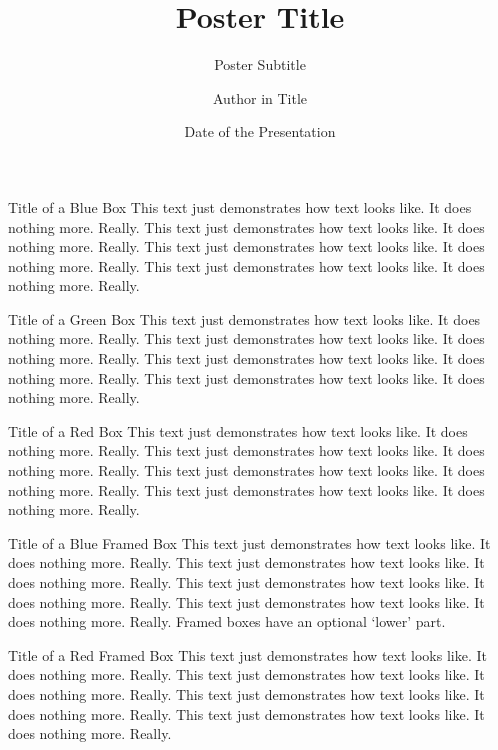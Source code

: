 \documentclass[cd=english,english,portrait]{univie-ling-poster}
\author[Author in Footline]{Author in Title}
\title{Poster Title}
\subtitle{Poster Subtitle}
\date{Date of the Presentation}
\begin{document}
\begin{frame}

\begin{bluebox}{Title of a Blue Box}
	This text just demonstrates how text looks like. It does nothing more. Really.
	This text just demonstrates how text looks like. It does nothing more. Really.
	This text just demonstrates how text looks like. It does nothing more. Really.
	This text just demonstrates how text looks like. It does nothing more. Really.
\end{bluebox}

\begin{greenbox}{Title of a Green Box}
	This text just demonstrates how text looks like. It does nothing more. Really.
	This text just demonstrates how text looks like. It does nothing more. Really.
	This text just demonstrates how text looks like. It does nothing more. Really.
	This text just demonstrates how text looks like. It does nothing more. Really.
\end{greenbox}


\begin{redbox}{Title of a Red Box}
	This text just demonstrates how text looks like. It does nothing more. Really.
	This text just demonstrates how text looks like. It does nothing more. Really.
	This text just demonstrates how text looks like. It does nothing more. Really.
	This text just demonstrates how text looks like. It does nothing more. Really.
\end{redbox}

\begin{blueframedbox}{Title of a Blue Framed Box}
	This text just demonstrates how text looks like. It does nothing more. Really.
	This text just demonstrates how text looks like. It does nothing more. Really.
	This text just demonstrates how text looks like. It does nothing more. Really.
	This text just demonstrates how text looks like. It does nothing more. Really.
	\tcblower
	Framed boxes have an optional \enquote*{lower} part.
\end{blueframedbox}

\begin{redframedbox}{Title of a Red Framed Box}
This text just demonstrates how text looks like. It does nothing more. Really.
This text just demonstrates how text looks like. It does nothing more. Really.
This text just demonstrates how text looks like. It does nothing more. Really.
This text just demonstrates how text looks like. It does nothing more. Really.
\end{redframedbox}


\end{frame}
\end{document}
